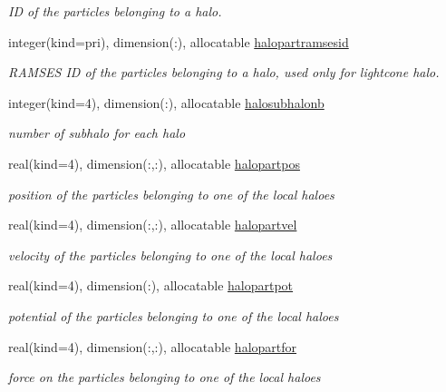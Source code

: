 \begin{DoxyCompactItemize}
\begin{DoxyCompactList}\small\item\em ID of the particles belonging to a halo. \end{DoxyCompactList}\item 
integer(kind=pri), dimension(\+:), allocatable \hyperlink{namespacemodhalo_a5b68c60e3d37130087e8314a89f8f880}{halopartramsesid}
\begin{DoxyCompactList}\small\item\em R\+A\+M\+S\+ES ID of the particles belonging to a halo, used only for lightcone halo. \end{DoxyCompactList}\item 
integer(kind=4), dimension(\+:), allocatable \hyperlink{namespacemodhalo_a5047e50f3939eaf91496eb430ea12952}{halosubhalonb}
\begin{DoxyCompactList}\small\item\em number of subhalo for each halo \end{DoxyCompactList}\item 
real(kind=4), dimension(\+:,\+:), allocatable \hyperlink{namespacemodhalo_a935d49a97e72fe931ab0e2cee84d1523}{halopartpos}
\begin{DoxyCompactList}\small\item\em position of the particles belonging to one of the local haloes \end{DoxyCompactList}\item 
real(kind=4), dimension(\+:,\+:), allocatable \hyperlink{namespacemodhalo_a9d88ee4555aab3eb3cc4626800de250b}{halopartvel}
\begin{DoxyCompactList}\small\item\em velocity of the particles belonging to one of the local haloes \end{DoxyCompactList}\item 
real(kind=4), dimension(\+:), allocatable \hyperlink{namespacemodhalo_ae632dc8638ef825d9db5997b21fd3b63}{halopartpot}
\begin{DoxyCompactList}\small\item\em potential of the particles belonging to one of the local haloes \end{DoxyCompactList}\item 
real(kind=4), dimension(\+:,\+:), allocatable \hyperlink{namespacemodhalo_aa850def902800d1eb780c6e4bd47edb9}{halopartfor}
\begin{DoxyCompactList}\small\item\em force on the particles belonging to one of the local haloes \end{DoxyCompactList}\item 

\end{DoxyCompactItemize}
